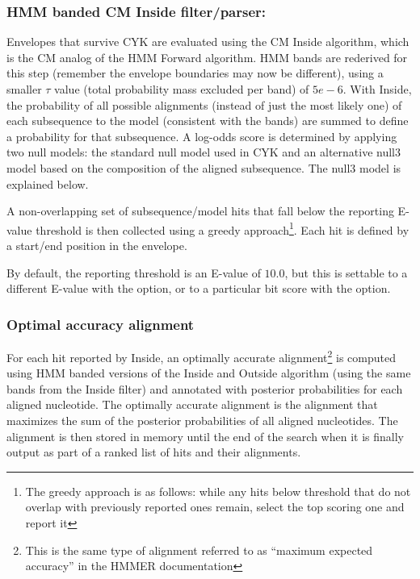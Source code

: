 \begin{sreoutput}
\subsubsection{HMM banded CM Inside filter/parser:}

Envelopes that survive CYK are evaluated using the CM Inside
algorithm, which is the CM analog of the HMM Forward algorithm. HMM
bands are rederived for this step (remember the envelope boundaries
may now be different), using a smaller $\tau$ value (total probability
mass excluded per band) of $5e-6$. With Inside, the probability of all
possible alignments (instead of just the most likely one) of each
subsequence to the model (consistent with the bands) are summed to
define a probability for that subsequence. A log-odds score is
determined by applying two null models: the standard null model used
in CYK and an alternative null3 model based on the composition of the
aligned subsequence. The null3 model is explained below. 

A non-overlapping set of subsequence/model hits that fall below the
reporting E-value threshold is then collected using a greedy
approach\footnote{The greedy approach is as follows: while any hits
below threshold that do not overlap with previously reported ones
remain, select the top scoring one and report it}. Each hit is defined
by a start/end position in the envelope. 

By default, the reporting threshold is an E-value of $10.0$, but this
is settable to a different E-value with the  option, or
to a particular bit score with the  option.

\subsubsection{Optimal accuracy alignment}

For each hit reported by Inside, an optimally accurate
alignment\footnote{This is the same type of alignment referred to as
``maximum expected accuracy'' in the HMMER documentation} is computed
using HMM banded versions of the Inside and Outside algorithm (using
the same bands from the Inside filter) and annotated with posterior
probabilities for each aligned nucleotide. The optimally accurate
alignment is the alignment that maximizes the sum of the posterior
probabilities of all aligned nucleotides. The alignment is then stored in
memory until the end of the search when it is finally output as part
of a ranked list of hits and their alignments.


\end{sreoutput}
